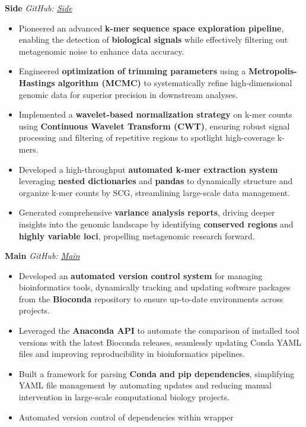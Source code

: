 \documentclass[a4paper,10pt]{article}
\begin{document}
	\textbf{Side} \hfill \textit{GitHub: \href{https://github.com/GABallena/Side}{Side}}
	\begin{itemize}[left=0pt]
		\item Pioneered an advanced \textbf{k-mer sequence space exploration pipeline}, enabling the detection of \textbf{biological signals} while effectively filtering out metagenomic noise to enhance data accuracy.
		\item Engineered \textbf{optimization of trimming parameters} using a \textbf{Metropolis-Hastings algorithm (MCMC)} to systematically refine high-dimensional genomic data for superior precision in downstream analyses.
		\item Implemented a \textbf{wavelet-based normalization strategy} on k-mer counts using \textbf{Continuous Wavelet Transform (CWT)}, ensuring robust signal processing and filtering of repetitive regions to spotlight high-coverage k-mers.
		\item Developed a high-throughput \textbf{automated k-mer extraction system} leveraging \textbf{nested dictionaries} and \textbf{pandas} to dynamically structure and organize k-mer counts by SCG, streamlining large-scale data management.
		\item Generated comprehensive \textbf{variance analysis reports}, driving deeper insights into the genomic landscape by identifying \textbf{conserved regions} and \textbf{highly variable loci}, propelling metagenomic research forward.
	\end{itemize}
	
	
	
		\textbf{Main} \hfill \textit{GitHub: \href{https://github.com/GABallena/Main}{Main}}
	\begin{itemize}[left=0pt]
		\item Developed an \textbf{automated version control system} for managing bioinformatics tools, dynamically tracking and updating software packages from the \textbf{Bioconda} repository to ensure up-to-date environments across projects.
		\item Leveraged the \textbf{Anaconda API} to automate the comparison of installed tool versions with the latest Bioconda releases, seamlessly updating Conda YAML files and improving reproducibility in bioinformatics pipelines.
		\item Built a framework for parsing \textbf{Conda and pip dependencies}, simplifying YAML file management by automating updates and reducing manual intervention in large-scale computational biology projects.
		\item Automated version control of dependencies within wrapper 
	\end{itemize}
	
\end{document}
